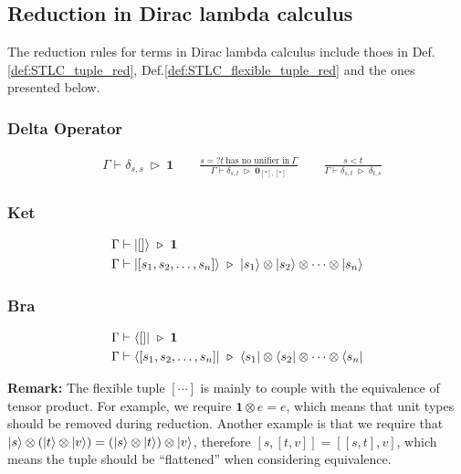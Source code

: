 \subsection{Reduction in Dirac lambda calculus}
The reduction rules for terms in Dirac lambda calculus include thoes in Def.\ref{def:STLC_tuple_red}, Def.\ref{def:STLC_flexible_tuple_red} and the ones presented below.


\subsubsection*{Delta Operator}
\begin{align*}
  & \Gamma \vdash \delta_{s, s}\ \triangleright\ \mathbf{1}
  \qquad
  \frac{s =? t\ \textrm{has no unifier in}\ \Gamma}{\Gamma \vdash \delta_{s, t} \ \triangleright\ \mathbf{0}_{[*], [*]}}
  \qquad
  \frac{s < t}{\Gamma \vdash \delta_{s, t} \ \triangleright\ \delta_{t, s}}
\end{align*}

\subsubsection*{Ket}
\begin{align*}
  & \Gamma \vdash \ket{[]} \ \triangleright\ \mathbf{1} \\
  & \Gamma \vdash \ket{[s_1, s_2, \dots, s_n]} \ \triangleright\ \ket{s_1} \otimes \ket{s_2} \otimes \cdots \otimes \ket{s_n}
\end{align*}

\subsubsection*{Bra}
\begin{align*}
  & \Gamma \vdash \bra{[]} \ \triangleright\ \mathbf{1} \\
  & \Gamma \vdash \bra{[s_1, s_2, \dots, s_n]} \ \triangleright\ \bra{s_1} \otimes \bra{s_2} \otimes \cdots \otimes \bra{s_n}
\end{align*}

\textbf{Remark: } The flexible tuple $[\cdots]$ is mainly to couple with the equivalence of tensor product. For example, we require $\mathbf{1} \otimes e = e$, which means that unit types should be removed during reduction. Another example is that we require that $|s\rangle \otimes (|t\rangle \otimes |v\rangle) = (|s\rangle \otimes |t\rangle) \otimes |v\rangle$, therefore $[s, [t, v]] = [[s, t], v]$, which means the tuple should be ``flattened'' when considering equivalence.

